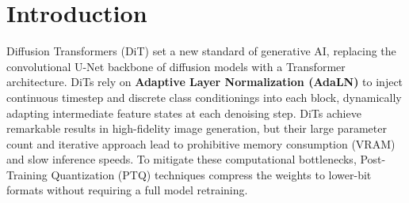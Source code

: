 \documentclass{article}
\begin{document}

\printAffiliationsAndNotice{}

\begin{abstract}
Diffusion Transformers (DiTs) have recently established a new baseline for image generation models, but their major limitations are the heavy computational and memory requirements.
To mitigate these bottlenecks, Post-Training Quantization (PTQ) offers a practical approach to compress these models without retraining.
In this project, we adapt SliderQuant, a PTQ algorithm originally designed for Large Language Models (LLMs), to the visual generation domain.
Code is available at: \url{https://github.com/DoctorWho28/SQ-DiT}.
\end{abstract}


\section{Introduction}\label{sec:intro}

Diffusion Transformers (DiT) set a new standard of generative AI, replacing the convolutional U-Net backbone of diffusion models with a Transformer architecture.
DiTs rely on \textbf{Adaptive Layer Normalization (AdaLN)} to inject continuous timestep and discrete class conditionings into each block, dynamically adapting intermediate feature states at each denoising step.
DiTs achieve remarkable results in high-fidelity image generation, but their large parameter count and iterative approach lead to prohibitive memory consumption (VRAM) and slow inference speeds.
To mitigate these computational bottlenecks, Post-Training Quantization (PTQ) techniques compress the weights to lower-bit formats without requiring a full model retraining.
\end{document}
